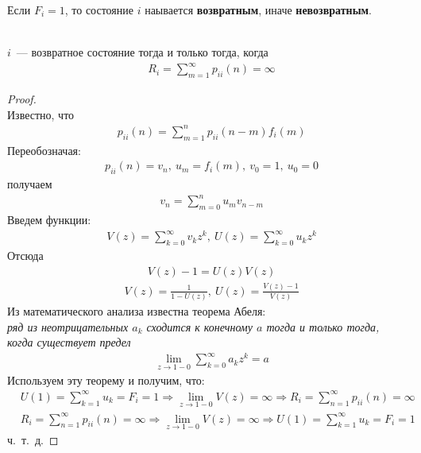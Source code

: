 \begin{Def}
    Если $F_i = 1$, то состояние $i$ наывается \textbf{возвратным}, иначе
    \textbf{невозвратным}.
\end{Def}
\begin{theorem}
    ~
    \\
    $i$~--- возвратное состояние тогда и только тогда, когда
    \begin{align*}
      & R_i = \sum_{m=1}^\infty p_{ii}(n) = \infty
    \end{align*}
\end{theorem}
\begin{proof}
    ~
    \\
    Известно, что
    \begin{align*}
      & p_{ii}(n) = \sum_{m=1}^n p_{ii}(n-m) f_i(m)
    \end{align*}
    Переобозначая:
    \begin{align*}
      & p_{ii}(n) = v_n, \ u_m = f_i(m), \ v_0 = 1, \ u_0 = 0
    \end{align*}
    получаем
    \begin{align*}
      & v_n = \sum_{m=0}^n u_mv_{n-m}
    \end{align*}
    Введем функции:
    \begin{align*}
      & V(z) = \sum_{k=0}^\infty v_kz^k, \ U(z) = \sum_{k=0}^\infty u_kz^k
    \end{align*}
    Отсюда
    \begin{align*}
      & V(z) - 1 = U(z)V(z)
    \end{align*}
    \begin{align*}
      & V(z) = \frac{1}{1-U(z)}, \ U(z) = \frac{V(z) - 1}{V(z)}
    \end{align*}
    Из математического анализа известна теорема Абеля:
    \\
    \textit{ряд из неотрицательных $a_k$ сходится к конечному $a$ тогда и только
      тогда, когда существует предел}
    \begin{align*}
      & \lim_{z \to 1-0}\sum_{k=0}^\infty a_k z^k = a
    \end{align*}
    Используем эту теорему и получим, что:
    \begin{align*}
      & U(1) = \sum_{k=1}^\infty u_k = F_i = 1 \Rightarrow \lim_{z \to 1-0} V(z) = \infty \Rightarrow R_i = \sum_{n=1}^\infty p_{ii}(n) = \infty
    \end{align*}
    \begin{align*}
      & R_i = \sum_{n=1}^\infty p_{ii}(n) = \infty \Rightarrow \lim_{z \to 1-0} V(z) = \infty \Rightarrow U(1) = \sum_{k=1}^\infty u_k = F_i = 1 
    \end{align*}
    ч.~т.~д.
\end{proof}
